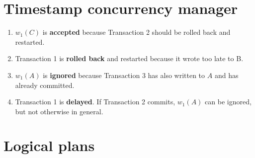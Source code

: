 \documentclass[12pt]{article}
\begin{document}
\section{Timestamp concurrency manager}

\begin{enumerate}
\item %
$w_1(C)$ is \textbf{accepted}
because Transaction 2 should be rolled back and restarted.

\item %
Transaction 1 is \textbf{rolled back}
and restarted because it wrote too late to B.

\item %
$w_1(A)$ is \textbf{ignored}
because Transaction 3 has also written to $A$ and has
already committed.

\item %
Transaction 1 is \textbf{delayed}. If Transaction 2 commits,
$w_1(A)$ can be ignored, but not otherwise in general.

\end{enumerate}

\section{Logical plans}
\end{document}
